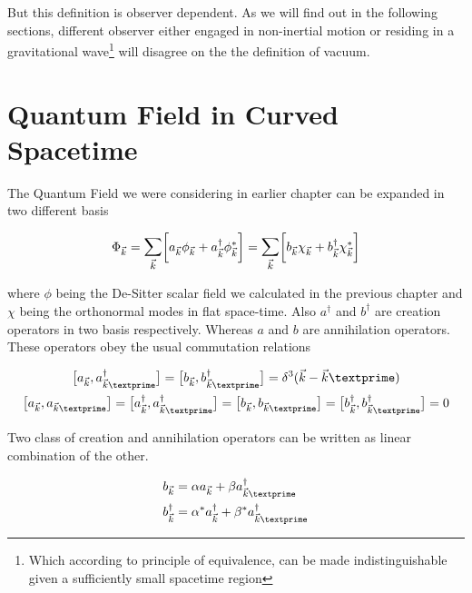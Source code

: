 But this definition is observer dependent. As we will find out in the following sections, different observer either engaged in non-inertial motion or residing in a gravitational wave\footnote{Which according to principle of equivalence, can be made indistinguishable given a sufficiently small spacetime region} will disagree on the the definition of vacuum.


\section{Quantum Field in Curved Spacetime}

The Quantum Field we were considering in earlier chapter can be expanded in two different basis 

\begin{equation}
\Phi_{\vec{k}} = \mathlarger{\sum_{\vec{k}}}\bigg[ a_{\vec{k}}\phi_{\vec{k}}+ a_{\vec{k}}^\dagger \phi_{\vec{k}}^*\bigg]= \mathlarger{\sum_{\vec{k}}}\bigg[ b_{\vec{k}}\chi_{\vec{k}}+ b_{\vec{k}}^\dagger \chi_{\vec{k}}^*\bigg]
\end{equation}

where $\phi$ being the De-Sitter scalar field we calculated in the previous chapter and $\chi$ being the orthonormal modes in flat space-time. Also $a^\dagger$ and $b^\dagger$ are creation operators in two basis respectively. Whereas $a$ and $b$ are annihilation operators. These operators obey the usual commutation relations

\begin{gather}
\big[a_{\vec{k}}, a^\dagger_{\vec{k}\textprime}\big]=\big[b_{\vec{k}}, b^\dagger_{\vec{k}\textprime}\big]=\delta ^3(\vec{k}-\vec{k}\textprime) \\
\big[a_{\vec{k}}, a_{\vec{k}\textprime}\big]=\big[a^\dagger_{\vec{k}}, a^\dagger_{\vec{k}\textprime}\big]=\big[b_{\vec{k}}, b_{\vec{k}\textprime}\big]= \big[b^\dagger_{\vec{k}}, b^\dagger_{\vec{k}\textprime}\big] = 0
\end{gather}

Two class of creation and annihilation operators can be written as linear combination of the other.

\begin{equation}
\begin{aligned}
& b_{\vec{k}}=\alpha a_{\vec{k}}+\beta a^\dagger_{\vec{k}\textprime} \\
&b^\dagger_{\vec{k}}=\alpha^* a^\dagger_{\vec{k}}+\beta^* a^\dagger_{\vec{k}\textprime} 
\end{aligned}
\end{equation}

